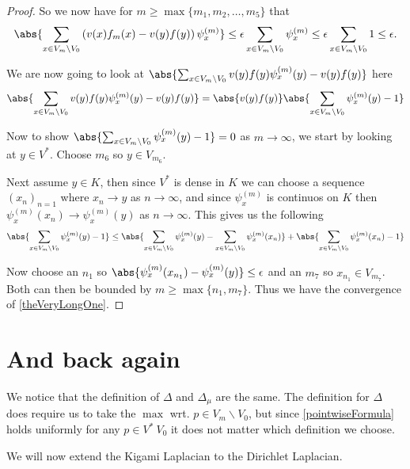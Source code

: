 \begin{proof}
	So we now have for $m \geq \max \{m_1, m_2, \ldots, m_5\}$ that
	\begin{equation}
		\abs{\sum_{x \in V_m \backslash V_0} \left(v(x) f_m(x) - v(y)f(y) \right) \psi_x^{(m)}} \leq \epsilon \sum_{x \in V_m \backslash V_0} \psi_x^{(m)} \leq \epsilon \sum_{x \in V_m \backslash V_0} 1 \leq \epsilon.
	\end{equation}
	
	We are now going to look at $\abs{\sum_{x \in V_m \backslash V_0} v(y) f(y) \psi_x^{(m)}(y) -v(y)f(y)}$ here
	\begin{equation}
		\abs{\sum_{x \in V_m \backslash V_0} v(y) f(y) \psi_x^{(m)}(y) -v(y)f(y)} = \abs{v(y)f(y)}\abs{\sum_{x \in V_m \backslash V_0} \psi_x^{(m)}(y) - 1}
	\end{equation}
	
	Now to show $\abs{\sum_{x \in V_m \backslash V_0} \psi_x^{(m)}(y) - 1} = 0$ as $m \to \infty$, we start by looking at $y \in V^*$. Choose $m_6$ so $y \in V_{m_6}$.
	
	Next assume $y \in K$, then since $V^{*}$ is dense in $K$ we can choose a sequence $(x_n)_{n = 1}$ where $x_n \to y$ as $n \to \infty$, and since $\psi_{x}^{(m)}$ is continuos on $K$ then $\psi_{x}^{(m)}(x_n) \to \psi_{x}^{(m)}(y)$ as $n \to \infty$. This gives us the following
	\begin{align}
		\abs{\sum_{x \in V_m \backslash V_0} \psi_x^{(m)}(y) - 1} \leq \abs{\sum_{x \in V_m \backslash V_0} \psi_x^{(m)}(y) - \sum_{x \in V_m \backslash V_0} \psi_x^{(m)}(x_n)} + \abs{\sum_{x \in V_m \backslash V_0} \psi_x^{(m)}(x_n) - 1}
	\end{align}
	
	Now choose an $n_1$ so $\abs{\psi_{x}^{(m)}(x_{n_1}) - \psi_{x}^{(m)}(y)} \leq \epsilon$ and an $m_7$ so $x_{n_1} \in V_{m_7}$. Both can then be bounded by $m \geq \max \{n_1, m_7\}$. Thus we have the convergence of \eqref{theVeryLongOne}.
\end{proof}

\section{And back again}
We notice that the definition of $\Delta$ and $\Delta_{\mu}$ are the same. The definition for $\Delta$ does require us to take the $\max$ wrt. $p \in V_m \backslash V_0$, but since \cref{pointwiseFormula} holds uniformly for any $p \in V^{*} \ V_0$ it does not matter which definition we choose.

We will now extend the Kigami Laplacian to the Dirichlet Laplacian.

